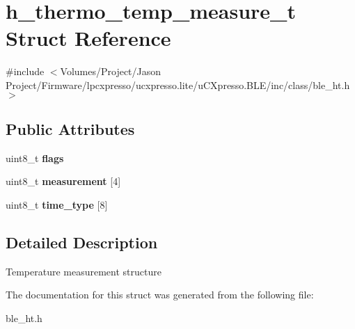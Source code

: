 \hypertarget{structh__thermo__temp__measure__t}{\section{h\-\_\-thermo\-\_\-temp\-\_\-measure\-\_\-t Struct Reference}
\label{structh__thermo__temp__measure__t}
}


{\ttfamily \#include $<$Volumes/\-Project/\-Jason Project/\-Firmware/lpcxpresso/ucxpresso.\-lite/u\-C\-Xpresso.\-B\-L\-E/inc/class/ble\-\_\-ht.\-h$>$}

\subsection*{Public Attributes}
\begin{DoxyCompactItemize}
\item 
\hypertarget{structh__thermo__temp__measure__t_afce338fd434c1af7a9d5ef07e4b6d3ad}{uint8\-\_\-t {\bfseries flags}}\label{structh__thermo__temp__measure__t_afce338fd434c1af7a9d5ef07e4b6d3ad}

\item 
\hypertarget{structh__thermo__temp__measure__t_a5804c9b8d6bb0fefe6e7811a41445909}{uint8\-\_\-t {\bfseries measurement} \mbox{[}4\mbox{]}}\label{structh__thermo__temp__measure__t_a5804c9b8d6bb0fefe6e7811a41445909}

\item 
\hypertarget{structh__thermo__temp__measure__t_ac2851384f5849c3f5e73d3397833b561}{uint8\-\_\-t {\bfseries time\-\_\-type} \mbox{[}8\mbox{]}}\label{structh__thermo__temp__measure__t_ac2851384f5849c3f5e73d3397833b561}

\end{DoxyCompactItemize}


\subsection{Detailed Description}
Temperature measurement structure 

The documentation for this struct was generated from the following file\-:\begin{DoxyCompactItemize}
\item 
ble\-\_\-ht.\-h\end{DoxyCompactItemize}
